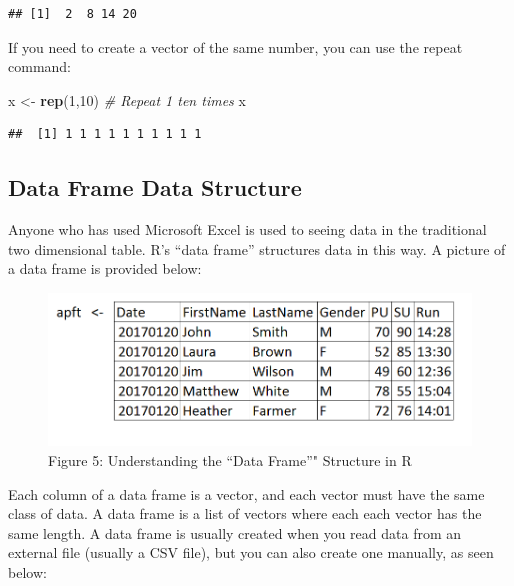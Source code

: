 \documentclass[]{book}
\newenvironment{Shaded}{\begin{snugshade}}{\end{snugshade}}
\newcommand{\KeywordTok}[1]{\textcolor[rgb]{0.13,0.29,0.53}{\textbf{{#1}}}}
\newcommand{\DecValTok}[1]{\textcolor[rgb]{0.00,0.00,0.81}{{#1}}}
\newcommand{\StringTok}[1]{\textcolor[rgb]{0.31,0.60,0.02}{{#1}}}
\newcommand{\CommentTok}[1]{\textcolor[rgb]{0.56,0.35,0.01}{\textit{{#1}}}}
\newcommand{\NormalTok}[1]{{#1}}
\begin{document}
\begin{verbatim}
## [1]  2  8 14 20
\end{verbatim}

If you need to create a vector of the same number, you can use the
repeat command:

\begin{Shaded}
\begin{Highlighting}[]
\NormalTok{x <-}\StringTok{ }\KeywordTok{rep}\NormalTok{(}\DecValTok{1}\NormalTok{,}\DecValTok{10}\NormalTok{)  }\CommentTok{# Repeat 1 ten times}
\NormalTok{x}
\end{Highlighting}
\end{Shaded}

\begin{verbatim}
##  [1] 1 1 1 1 1 1 1 1 1 1
\end{verbatim}

\subsection{Data Frame Data Structure}\label{data-frame-data-structure}

Anyone who has used Microsoft Excel is used to seeing data in the
traditional two dimensional table. R's ``data frame'' structures data in
this way. A picture of a data frame is provided below:

\begin{figure}[htbp]
\centering
\includegraphics{dataframe.PNG}
\caption{Figure 5: Understanding the ``Data Frame''" Structure in R}
\end{figure}

Each column of a data frame is a vector, and each vector must have the
same class of data. A data frame is a list of vectors where each each
vector has the same length. A data frame is usually created when you
read data from an external file (usually a CSV file), but you can also
create one manually, as seen below:
\end{document}
